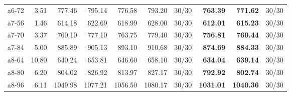 \documentclass[aspectratio=1610]{beamer}
\begin{document}
\begin{frame}
\begin{table}[]
{\begin{tabular}{lrrrrrrrrr}
a6-72                                          & 3.51              & 777.46  & \multicolumn{1}{r|}{795.14}   & 776.58  & 793.20   & \multicolumn{1}{r|}{30/30} & \textbf{763.39}  & {\color[HTML]{FE0000} \textbf{771.62}}  & 30/30 \\
a7-56                                          & 1.46              & 614.18  & \multicolumn{1}{r|}{622.69}   & 618.99  & 628.00   & \multicolumn{1}{r|}{30/30} & \textbf{612.01}  & {\color[HTML]{FE0000} \textbf{615.23}}  & 30/30 \\
a7-70                                          & 3.37              & 760.10  & \multicolumn{1}{r|}{777.10}   & 763.75  & 779.40   & \multicolumn{1}{r|}{30/30} & \textbf{756.81}  & {\color[HTML]{FE0000} \textbf{760.44}}  & 30/30 \\
a7-84                                          & 5.00              & 885.89  & \multicolumn{1}{r|}{905.13}   & 893.10  & 910.68   & \multicolumn{1}{r|}{30/30} & \textbf{874.69}  & {\color[HTML]{FE0000} \textbf{884.33}}  & 30/30 \\
a8-64                                          & 10.80             & 640.24  & \multicolumn{1}{r|}{653.81}   & 646.60  & 658.10   & \multicolumn{1}{r|}{30/30} & \textbf{634.04}  & {\color[HTML]{FE0000} \textbf{639.14}}  & 30/30 \\
a8-80                                          & 6.20              & 804.02  & \multicolumn{1}{r|}{826.92}   & 813.97  & 827.17   & \multicolumn{1}{r|}{30/30} & \textbf{792.92}  & {\color[HTML]{FE0000} \textbf{802.74}}  & 30/30 \\
a8-96                                          & 6.11              & 1049.98 & \multicolumn{1}{r|}{1077.21}  & 1056.50 & 1080.17  & \multicolumn{1}{r|}{30/30} & \textbf{1031.01} & {\color[HTML]{FE0000} \textbf{1040.36}} & 30/30 \\ \hline
\end{tabular}%
}
\end{table}

\end{frame}
\end{document}
